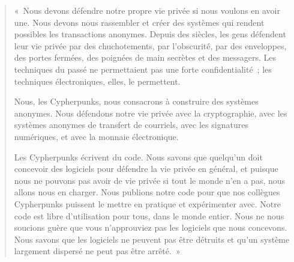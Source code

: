 \begin{quote}
«~Nous devons défendre notre propre vie privée si nous voulons en avoir une. Nous devons nous rassembler et créer des systèmes qui rendent possibles les transactions anonymes. Depuis des siècles, les gens défendent leur vie privée par des chuchotements, par l'obscurité, par des enveloppes, des portes fermées, des poignées de main secrètes et des messagers. Les techniques du passé ne permettaient pas une forte confidentialité~; les techniques électroniques, elles, le permettent.

Nous, les Cypherpunks, nous consacrons à construire des systèmes anonymes. Nous défendons notre vie privée avec la cryptographie, avec les systèmes anonymes de transfert de courriels, avec les signatures numériques, et avec la monnaie électronique.

Les Cypherpunks écrivent du code. Nous savons que quelqu'un doit concevoir des logiciels pour défendre la vie privée en général, et puisque nous ne pouvons pas avoir de vie privée si tout le monde n'en a pas, nous allons nous en charger. Nous publions notre code pour que nos collègues Cypherpunks puissent le mettre en pratique et expérimenter avec. Notre code est libre d'utilisation pour tous, dans le monde entier. Nous ne nous soucions guère que vous n'approuviez pas les logiciels que nous concevons. Nous savons que les logiciels ne peuvent pas être détruits et qu'un système largement dispersé ne peut pas être arrêté.~»
\end{quote} %
%
%

